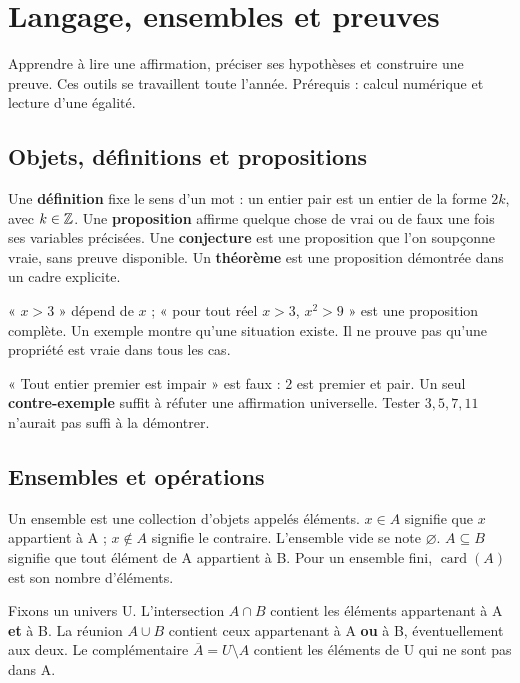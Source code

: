 \documentclass[../cours_2de.tex]{subfiles}
\begin{document}
\setcounter{chapter}{0}
\chapter{Langage, ensembles et preuves}
\label{sec:ch01}
\begin{objectif}
Apprendre à lire une affirmation, préciser ses hypothèses et construire une preuve. Ces outils se travaillent toute l'année. Prérequis : calcul numérique et lecture d'une égalité.
\end{objectif}
\section{Objets, définitions et propositions}
Une \textbf{définition} fixe le sens d'un mot : un entier pair est un entier de la forme $2k$, avec $k\in\mathbb{Z}$. Une \textbf{proposition} affirme quelque chose de vrai ou de faux une fois ses variables précisées. Une \textbf{conjecture} est une proposition que l'on soupçonne vraie, sans preuve disponible. Un \textbf{théorème} est une proposition démontrée dans un cadre explicite.

« $x>3$ » dépend de $x$ ; « pour tout réel $x>3$, $x^2>9$ » est une proposition complète. Un exemple montre qu'une situation existe. Il ne prouve pas qu'une propriété est vraie dans tous les cas.
\begin{exemple}
« Tout entier premier est impair » est faux : $2$ est premier et pair. Un seul \textbf{contre-exemple} suffit à réfuter une affirmation universelle. Tester $3,5,7,11$ n'aurait pas suffi à la démontrer.
\end{exemple}
\section{Ensembles et opérations}
\begin{definition}
Un ensemble est une collection d'objets appelés éléments. $x\in A$ signifie que $x$ appartient à A ; $x\notin A$ signifie le contraire. L'ensemble vide se note $\varnothing$. $A\subseteq B$ signifie que tout élément de A appartient à B. Pour un ensemble fini, $\operatorname{card}(A)$ est son nombre d'éléments.
\end{definition}
Fixons un univers U. L'intersection $A\cap B$ contient les éléments appartenant à A \textbf{et} à B. La réunion $A\cup B$ contient ceux appartenant à A \textbf{ou} à B, éventuellement aux deux. Le complémentaire $\overline A=U\setminus A$ contient les éléments de U qui ne sont pas dans A.
\end{document}
